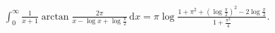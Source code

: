 %

\begin{problem}[pytanie 1150822]
    \label{stack_1150822}%
    \begin{align}
        \int_0^\infty \frac{1}{x+1} \arctan \frac {2\pi}{x - \log x + \log \frac \pi 2} \,\mathrm{d}x = \pi \log \frac{1 + \pi^2 + ( \log \frac \pi 2)^2- 2  \log \frac \pi 2}{1 + \frac{\pi^2}{4}}.
    \end{align}
\end{problem}

%
